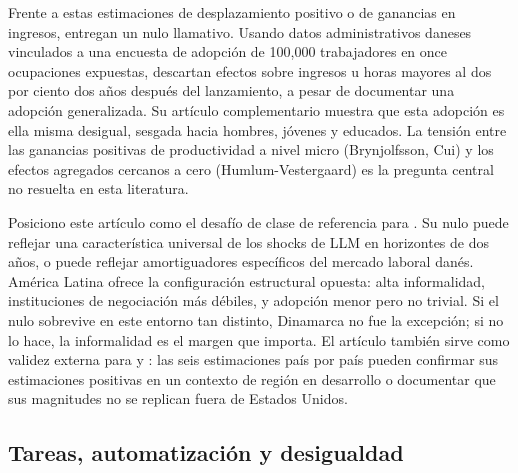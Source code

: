 Frente a estas estimaciones de desplazamiento positivo o de ganancias en ingresos, \citet{HumlumVestergaard2025_llm} entregan un nulo llamativo. Usando datos administrativos daneses vinculados a una encuesta de adopci\'{o}n de 100{,}000 trabajadores en once ocupaciones expuestas, descartan efectos sobre ingresos u horas mayores al dos por ciento dos a\~{n}os despu\'{e}s del lanzamiento, a pesar de documentar una adopci\'{o}n generalizada. Su art\'{i}culo complementario \citep{HumlumVestergaard2025_pnas} muestra que esta adopci\'{o}n es ella misma desigual, sesgada hacia hombres, j\'{o}venes y educados. La tensi\'{o}n entre las ganancias positivas de productividad a nivel micro (Brynjolfsson, Cui) y los efectos agregados cercanos a cero (Humlum-Vestergaard) es la pregunta central no resuelta en esta literatura.

Posiciono este art\'{i}culo como el desaf\'{i}o de clase de referencia para \citet{HumlumVestergaard2025_llm}. Su nulo puede reflejar una caracter\'{i}stica universal de los shocks de LLM en horizontes de dos a\~{n}os, o puede reflejar amortiguadores espec\'{i}ficos del mercado laboral dan\'{e}s. Am\'{e}rica Latina ofrece la configuraci\'{o}n estructural opuesta: alta informalidad, instituciones de negociaci\'{o}n m\'{a}s d\'{e}biles, y adopci\'{o}n menor pero no trivial. Si el nulo sobrevive en este entorno tan distinto, Dinamarca no fue la excepci\'{o}n; si no lo hace, la informalidad es el margen que importa. El art\'{i}culo tambi\'{e}n sirve como validez externa para \citet{Hartley2024_labor_effects} y \citet{Chen2025_llm_unemployment}: las seis estimaciones pa\'{i}s por pa\'{i}s pueden confirmar sus estimaciones positivas en un contexto de regi\'{o}n en desarrollo o documentar que sus magnitudes no se replican fuera de Estados Unidos.

\subsection{Tareas, automatizaci\'{o}n y desigualdad}
\label{subsec:lit_theory}

